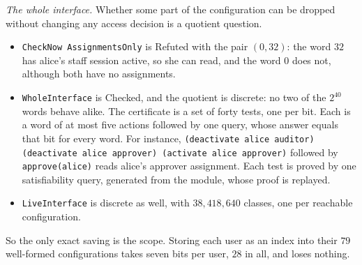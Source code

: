 \documentclass[11pt]{article}
\newcommand{\code}[1]{\texttt{#1}}
\theoremstyle{definition}
\theoremstyle{plain}
\begin{document}
\emph{The whole interface.} Whether some part of the configuration can be dropped without changing
any access decision is a quotient question.
\begin{itemize}
\item \code{CheckNow AssignmentsOnly} is Refuted with the pair $(0,32)$: the word $32$ has alice's
staff session active, so she can read, and the word $0$ does not, although both have no assignments.
\item \code{WholeInterface} is Checked, and the quotient is discrete: no two of the $2^{40}$ words
behave alike. The certificate is a set of forty tests, one per bit. Each is a word of at most five
actions followed by one query, whose answer equals that bit for every word. For instance,
\code{(deactivate alice auditor) (deactivate alice approver) (activate alice approver)} followed by
\code{approve(alice)} reads alice's approver assignment. Each test is proved by one satisfiability
query, generated from the module, whose proof is replayed.
\item \code{LiveInterface} is discrete as well, with $38{,}418{,}640$ classes, one per reachable
configuration.
\end{itemize}
So the only exact saving is the scope. Storing each user as an index into their $79$ well-formed
configurations takes seven bits per user, $28$ in all, and loses nothing.
\end{document}
